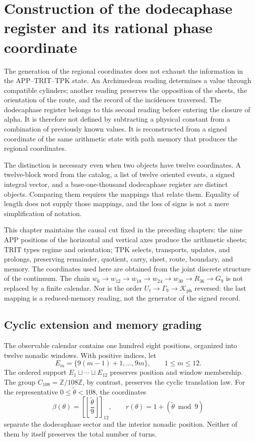 \section{Construction of the dodecaphase register and its rational phase coordinate}
\label{sec:k-registro}

The generation of the regional coordinates does not exhaust the information
in the APP--TRIT--TPK state. An Archimedean reading determines a value through
compatible cylinders; another reading preserves the opposition of the sheets,
the orientation of the route, and the record of the incidences traversed. The
dodecaphase register belongs to this second reading before entering the closure
of alpha. It is therefore not defined by subtracting a physical constant from
a combination of previously known values. It is reconstructed from a signed
coordinate of the same arithmetic state with path memory that produces the
regional coordinates.

The distinction is necessary even when two objects have twelve coordinates.
A twelve-block word from the catalog, a list of twelve oriented events, a
signed integral vector, and a base-one-thousand dodecaphase register are
distinct objects. Comparing them requires the mappings that relate them.
Equality of length does not supply those mappings, and the loss of signs is
not a mere simplification of notation.

This chapter maintains the causal cut fixed in the preceding chapters:
the nine APP positions of the horizontal and vertical axes produce the
arithmetic sheets; TRIT types regime and orientation; TPK selects,
transports, updates, and prolongs, preserving remainder, quotient, carry,
sheet, route, boundary, and memory. The coordinates used here are obtained
from the joint discrete structure of the continuum. The chain
\(w_6\to w_{12}\to w_{18}\to w_{24}\to w_{30}\to R_{36}\to G_9\)
is not replaced by a finite calendar. Nor is the order
\(U_t\to\Gamma_9\to\mathcal K_{\mathrm{ph}}\) reversed: the last mapping is
a reduced-memory reading, not the generator of the signed record.



\subsection{Cyclic extension and memory grading}
\label{subsec:k-calendario}

The observable calendar contains one hundred eight positions, organized into
twelve nonadic windows. With positive indices, let
\[
 E_m=\{9(m-1)+1,\ldots,9m\},\qquad 1\leq m\leq12.
\]
The ordered support \(E_1\sqcup\cdots\sqcup E_{12}\) preserves position and
window membership. The group \(C_{108}=\mathbb Z/108\mathbb Z\), by
contrast, preserves the cyclic translation law. For the representative
\(0\leq\widetilde\theta<108\), the coordinates
\[
 \beta(\theta)=\left[\left\lfloor\frac{\widetilde\theta}{9}\right\rfloor\right]_{12},
 \qquad r(\theta)=1+(\widetilde\theta\bmod9)
\]
separate the dodecaphase sector and the interior nonadic position. Neither
of them by itself preserves the total number of turns.

